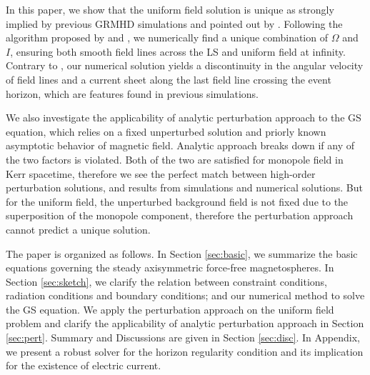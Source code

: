 \documentclass[iop,apj]{emulateapj}
\begin{document}
In this paper, we show that the uniform field solution is
unique as strongly implied by previous GRMHD simulations
and pointed out by \citet{Nathanail2014}.
Following the algorithm proposed by \citet{Contopoulos2013} and \citet{Nathanail2014},
we numerically find a unique combination of $\Omega$ and $I$,
ensuring both smooth field lines across the LS and uniform field at infinity.
Contrary to \citet{Nathanail2014}, our numerical solution yields a discontinuity in the angular velocity of
field lines and a current sheet along the last field line crossing the event horizon,
which are features found in previous simulations.

We also investigate the applicability of analytic perturbation approach to the GS equation,
which relies on a fixed unperturbed solution and priorly known asymptotic behavior of magnetic field.
Analytic approach breaks down if any of the two factors is violated.
Both of the two are satisfied for monopole field in Kerr spacetime,
therefore we see the perfect match between high-order perturbation solutions,
and results from simulations and numerical solutions.
But for the uniform field, the unperturbed background field is not fixed due to
the superposition of the monopole component, therefore the perturbation approach
cannot predict a unique solution.


The paper is organized as follows. In Section \ref{sec:basic},
we summarize the basic equations governing the steady axisymmetric force-free magnetospheres.
In Section \ref{sec:sketch}, we clarify the relation between constraint conditions, radiation
conditions and boundary conditions; and our numerical method to solve the GS equation.
We apply the perturbation approach on the uniform field problem
and clarify the applicability of analytic perturbation approach in Section \ref{sec:pert}.
Summary and Discussions are given in Section \ref{sec:disc}. In Appendix, we present a robust solver
for the horizon regularity condition and its implication for the existence of electric current.
\end{document}
